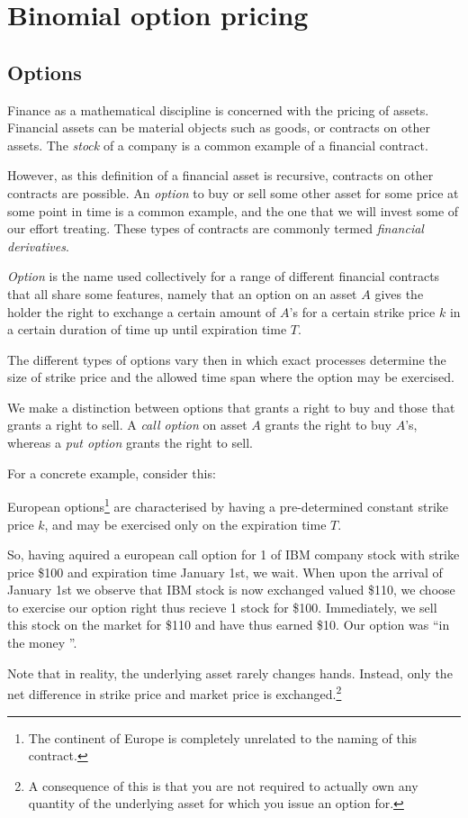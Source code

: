 \section{Binomial option pricing}

\subsection{Options}

Finance as a mathematical discipline is concerned with the pricing of assets.
Financial assets can be material objects such as goods, or contracts on other
assets. The \emph{stock} of a company is a common example of a financial contract.

However, as this definition of a financial asset is recursive, contracts on
other contracts are possible. An
\emph{option} to buy or sell some other asset for some price at some point in
time is a common example, and the one that we will invest some of our effort
treating. These types of contracts are commonly termed \emph{financial derivatives}.


\emph{Option} is the name used collectively for a range of different financial
contracts that all share some features, namely that an option on an asset $A$
gives the holder the right to exchange a certain amount of $A$'s for a certain
strike price $k$ in a certain duration of time up until expiration time $T$.

The different types of options vary then in which exact processes determine the
size of strike price and the allowed time span where the option may be
exercised.

We make a distinction between options that grants a right to buy and those that
grants a right to sell. A \emph{call option} on asset $A$ grants the right to
buy $A$'s, whereas a \emph{put option} grants the right to sell.

For a concrete example, consider this:
\begin{example}

  European options\footnote{The continent of Europe is completely unrelated to
  the naming of this contract.} are characterised by having a pre-determined
  constant strike price $k$, and may be exercised only on the expiration time
  $T$.

  So, having aquired a european call option for 1 of IBM company stock with
  strike price \$100 and expiration time January 1st, we wait.  When upon the
  arrival of January 1st we observe that IBM stock is now exchanged valued
  \$110, we choose to exercise our option right thus recieve 1 stock for \$100.
  Immediately, we sell this stock on the market for \$110 and have thus earned
  \$10. Our option was ``in the money ''.

  Note that in reality, the underlying asset rarely changes hands. Instead,
  only the net difference in strike price and market price is
  exchanged.\footnote{A consequence of this is that you are not required to
  actually own any quantity of the underlying asset for which you issue an
  option for.}

\end{example}

